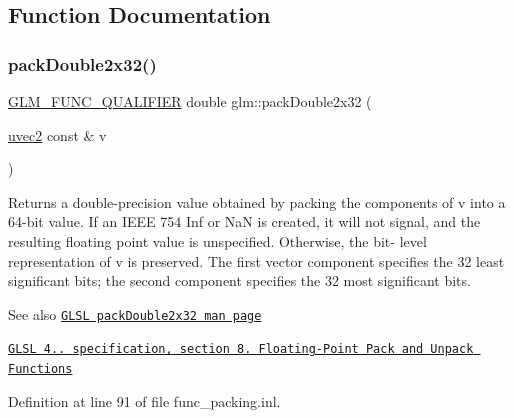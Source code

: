 \subsection{Function Documentation}
\mbox{\label{group__core__func__packing_gaf728fdfb98ce34da6f968d9f6bf154d7}} 
\subsubsection{\texorpdfstring{pack\+Double2x32()}{packDouble2x32()}}
{\footnotesize\ttfamily \hyperlink{setup_8hpp_a33fdea6f91c5f834105f7415e2a64407}{G\+L\+M\+\_\+\+F\+U\+N\+C\+\_\+\+Q\+U\+A\+L\+I\+F\+I\+ER} double glm\+::pack\+Double2x32 (\begin{DoxyParamCaption}\item[{\hyperlink{group__core__types_gafd2041b45eff671aa8899d2c2835eee9}{uvec2} const \&}]{v }\end{DoxyParamCaption})}

Returns a double-\/precision value obtained by packing the components of v into a 64-\/bit value. If an I\+E\+EE 754 Inf or NaN is created, it will not signal, and the resulting floating point value is unspecified. Otherwise, the bit-\/ level representation of v is preserved. The first vector component specifies the 32 least significant bits; the second component specifies the 32 most significant bits.

\begin{DoxySeeAlso}{See also}
\href{http://www.opengl.org/sdk/docs/manglsl/xhtml/packDouble2x32.xml}{\tt G\+L\+SL pack\+Double2x32 man page} 

\href{http://www.opengl.org/registry/doc/GLSLangSpec.4.20.8.pdf}{\tt G\+L\+SL 4.. specification, section 8. Floating-\/\+Point Pack and Unpack Functions} 
\end{DoxySeeAlso}


Definition at line 91 of file func\+\_\+packing.\+inl.

\mbox{\label{group__core__func__packing_ga082f6dd65f73a547ed3067ef00be036f}} 
